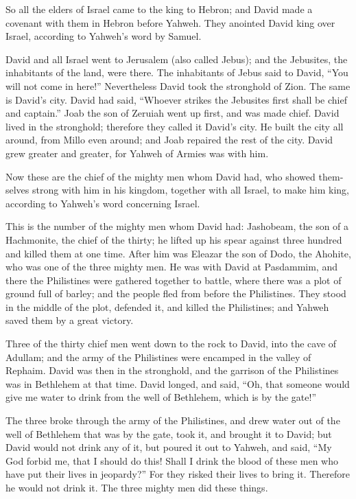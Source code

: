 \begin{paracol}{2}
\begin{otherlanguage}{english}
 So all the elders of Israel came to the king to Hebron;
and David made a covenant with them in Hebron before Yahweh. They
anointed David king over Israel, according to Yahweh's word by Samuel.

 David and all Israel went to Jerusalem (also called
Jebus); and the Jebusites, the inhabitants of the land, were there.
 The inhabitants of Jebus said to David, ``You will not
come in here!'' Nevertheless David took the stronghold of Zion. The same
is David's city.  David had said, ``Whoever strikes the
Jebusites first shall be chief and captain.'' Joab the son of Zeruiah
went up first, and was made chief.  David lived in the
stronghold; therefore they called it David's city.  He
built the city all around, from Millo even around; and Joab repaired the
rest of the city.  David grew greater and greater, for
Yahweh of Armies was with him.

 Now these are the chief of the mighty men whom David
had, who showed themselves strong with him in his kingdom, together with
all Israel, to make him king, according to Yahweh's word concerning
Israel.

 This is the number of the mighty men whom David had:
Jashobeam, the son of a Hachmonite, the chief of the thirty; he lifted
up his spear against three hundred and killed them at one time.
 After him was Eleazar the son of Dodo, the Ahohite, who
was one of the three mighty men.  He was with David at
Pasdammim, and there the Philistines were gathered together to battle,
where there was a plot of ground full of barley; and the people fled
from before the Philistines.  They stood in the middle of
the plot, defended it, and killed the Philistines; and Yahweh saved them
by a great victory.

 Three of the thirty chief men went down to the rock to
David, into the cave of Adullam; and the army of the Philistines were
encamped in the valley of Rephaim.  David was then in the
stronghold, and the garrison of the Philistines was in Bethlehem at that
time.  David longed, and said, ``Oh, that someone would
give me water to drink from the well of Bethlehem, which is by the
gate!''

 The three broke through the army of the Philistines, and
drew water out of the well of Bethlehem that was by the gate, took it,
and brought it to David; but David would not drink any of it, but poured
it out to Yahweh,  and said, ``My God forbid me, that I
should do this! Shall I drink the blood of these men who have put their
lives in jeopardy?'' For they risked their lives to bring it. Therefore
he would not drink it. The three mighty men did these things.


\end{otherlanguage}
\end{paracol}
